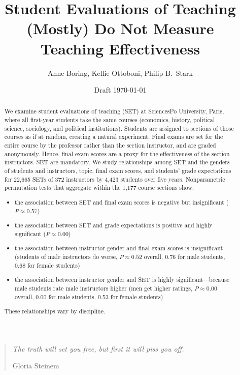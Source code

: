 \documentclass[12pt]{article}
\title{Student Evaluations of Teaching (Mostly) Do Not Measure Teaching Effectiveness}
\author{Anne Boring, Kellie Ottoboni, Philip B.~Stark}
\date{Draft \today}
\begin{document}
\maketitle

\newpage
\begin{quotation}
    \emph{The truth will set you free, but first it will piss you off.}
    
     \hfill Gloria Steinem

\begin{abstract}
We examine student evaluations of teaching (SET) at SciencesPo
University, Paris, where all
first-year students take the same courses 
(economics, history, political science, sociology, and political institutions). 
Students are assigned to sections of those courses as if at random, creating a natural experiment.
Final exams are set for the entire course
by the professor rather than the section instructor, and are graded anonymously.
Hence, final exam scores are a proxy for the effectiveness of the section instructors.
SET are mandatory.
We study relationships among SET and the genders of students and
instructors, topic, final exam scores, and students' grade expectations
for 22,665 SETs of 372 instructors by 4,423 students over five years.
Nonparametric permutation tests that aggregate within the 1,177 course sections show: 
\begin{itemize}
   \item the association between SET and final 
            exam scores is negative but insignificant
            ($P \approx 0.57$)
   \item the association between SET and grade 
            expectations is positive and highly significant
            ($P \approx 0.00$)
   \item the association between instructor gender 
            and final exam scores is insignificant
            (students of male instructors do worse, $P \approx 0.52$ overall, $0.76$ 
            for male students, $0.68$ for female students)
   \item the association between instructor gender and SET is highly significant---because male
             students rate male instructors higher 
            (men get higher ratings, $P \approx 0.00$ overall, $0.00$ for male students,
            $0.53$ for female students)
\end{itemize}
These relationships vary by discipline.

\end{abstract}

\newpage

\end{quotation}
\end{document}
